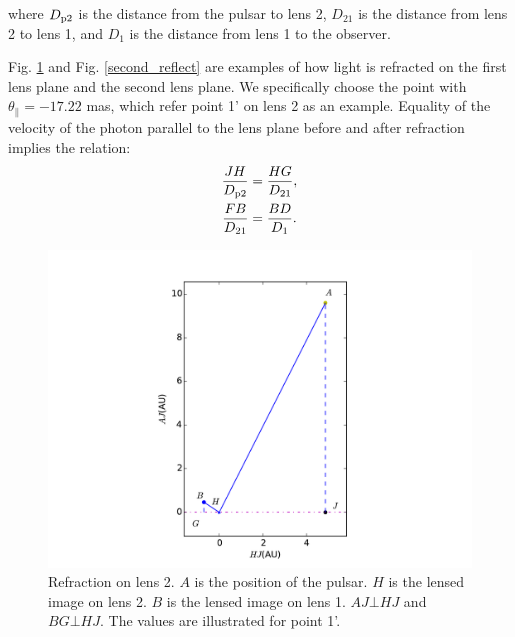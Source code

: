 \documentclass[useAMS,usenatbib]{mn2e}
\begin{document}
where $D_{\rm p2}$ is the distance from the pulsar to lens 2, $D_{21}$ is the distance from lens 2 to lens 1, and $D_{1}$ is the distance from lens 1 to the observer.

Fig. \ref{first_reflect} and Fig. \ref{second_reflect} are examples of how light is refracted on the first lens plane and the second lens plane. We specifically choose the point with $\theta_{\parallel}=-17.22$ mas, which refer point 1' on lens 2 as an example.  
Equality of the velocity of the photon parallel to the lens plane before and after refraction implies the relation:
\begin{equation}
\begin{aligned}
\frac{JH}{D_{\rm p2}}&=\frac{HG}{D_{21}},\\
\frac{FB}{D_{21}}&=\frac{BD}{D_{1}}.
\end{aligned}
\end{equation}


\begin{figure}
\centering
\includegraphics[width=1.0\linewidth,scale=1.0]{First_reflection.pdf}
\caption{Refraction on lens 2. 
$A$ is the position of the pulsar.  $H$ is the lensed image on lens 2.  $B$ is
the lensed image on lens 1. $AJ\bot HJ$ and $BG\bot HJ$.  The values are illustrated for point 1'.}
\label{first_reflect}
\end{figure}
\end{document}
